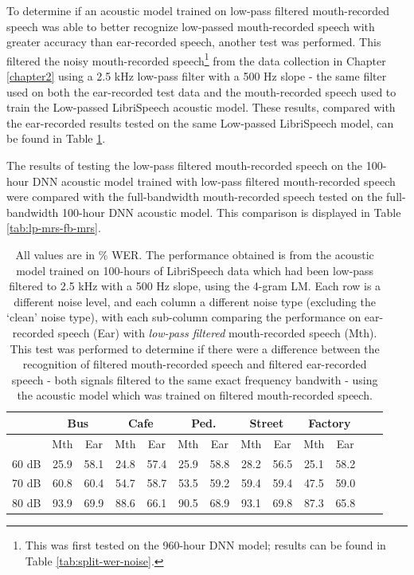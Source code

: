 To determine if an acoustic model trained on low-pass filtered mouth-recorded speech was able to better recognize low-passed mouth-recorded speech with greater accuracy than ear-recorded speech, another test was performed.  This filtered the noisy mouth-recorded speech\footnote{This was first tested on the 960-hour DNN model; results can be found in Table \ref{tab:split-wer-noise}.} from the data collection in Chapter \ref{chapter2} using a 2.5 kHz low-pass filter with a 500 Hz slope - the same filter used on both the ear-recorded test data and the mouth-recorded speech used to train the Low-passed LibriSpeech acoustic model.  These results, compared with the ear-recorded results tested on the same Low-passed LibriSpeech model, can be found in Table \ref{tab:lp-ers-mrs}.

The results of testing the low-pass filtered mouth-recorded speech on the 100-hour DNN acoustic model trained with low-pass filtered mouth-recorded speech were compared with the full-bandwidth mouth-recorded speech tested on the full-bandwidth 100-hour DNN acoustic model.  This comparison is displayed in Table \ref{tab:lp-mrs-fb-mrs}.

\begin{table}[h]
\begin{center}
\begin{tabular}{| c || c | c | c | c | c | c | c | c | c | c | c | c |} \hline
      & \multicolumn{2}{|c|}{Bus} & \multicolumn{2}{|c|}{Cafe} & \multicolumn{2}{|c|}{Ped.} & \multicolumn{2}{|c|}{Street} & \multicolumn{2}{|c|}{Factory} \\ \hline
      & Mth & Ear & Mth & Ear & Mth & Ear & Mth & Ear & Mth & Ear \\ \hline\hline
60 dB & 25.9 & 58.1 & 24.8 & 57.4 & 25.9 & 58.8 & 28.2 & 56.5 & 25.1 & 58.2  \\ \hline
70 dB & 60.8 & 60.4 & 54.7 & 58.7 & 53.5 & 59.2 & 59.4 & 59.4 & 47.5 & 59.0  \\ \hline
80 dB & 93.9 & 69.9 & 88.6 & 66.1 & 90.5 & 68.9 & 93.1 & 69.8 & 87.3 & 65.8  \\ \hline
\end{tabular}
\end{center}
\caption{All values are in \% WER. The performance obtained is from the acoustic model trained on 100-hours of LibriSpeech data which had been low-pass filtered to 2.5 kHz with a 500 Hz slope, using the 4-gram LM. Each row is a different noise level, and each column a different noise type (excluding the `clean' noise type), with each sub-column comparing the performance on ear-recorded speech (Ear) with \textit{low-pass filtered} mouth-recorded speech (Mth). This test was performed to determine if there were a difference between the recognition of filtered mouth-recorded speech and filtered ear-recorded speech - both signals filtered to the same exact frequency bandwith - using the acoustic model which was trained on filtered mouth-recorded speech.}\label{tab:lp-ers-mrs}
\end{table}



